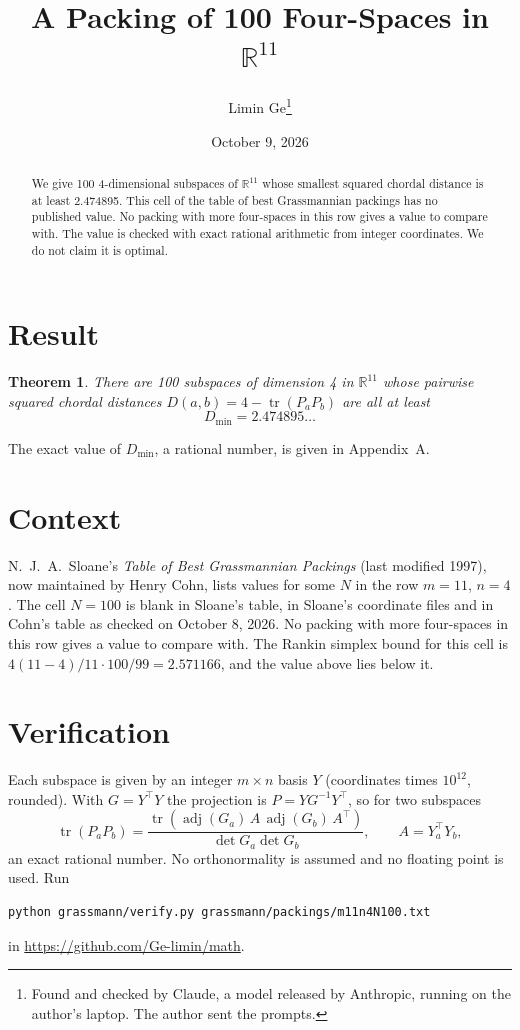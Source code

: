 \documentclass[11pt,a4paper]{article}
\title{A Packing of 100 Four-Spaces in $\mathbb{R}^{11}$}
\author{Limin Ge\thanks{Found and checked by Claude, a model released by Anthropic, running on the author's laptop. The author sent the prompts.}}
\date{October 9, 2026}
\newtheorem*{theorem}{Theorem}
\begin{document}
\maketitle
\begin{abstract}
We give 100 4-dimensional subspaces of $\mathbb{R}^{11}$ whose smallest squared chordal distance is at least 2.474895. This cell of the table of best Grassmannian packings has no published value. No packing with more four-spaces in this row gives a value to compare with. The value is checked with exact rational arithmetic from integer coordinates. We do not claim it is optimal.
\end{abstract}

\section{Result}
\begin{theorem}
There are 100 subspaces of dimension 4 in $\mathbb{R}^{11}$ whose pairwise squared chordal distances $D(a,b) = 4 - \operatorname{tr}(P_aP_b)$ are all at least
\[ D_{\min} = 2.474895\ldots \]
\end{theorem}
The exact value of $D_{\min}$, a rational number, is given in Appendix~A.


\section{Context}
N.~J.~A.~Sloane's \emph{Table of Best Grassmannian Packings} (last modified 1997), now maintained by Henry Cohn, lists values for some $N$ in the row $m=11$, $n=4$. The cell $N=100$ is blank in Sloane's table, in Sloane's coordinate files and in Cohn's table as checked on October 8, 2026. No packing with more four-spaces in this row gives a value to compare with. The Rankin simplex bound for this cell is $4(11-4)/11\cdot 100/99 = 2.571166$, and the value above lies below it.


\section{Verification}
Each subspace is given by an integer $m\times n$ basis $Y$ (coordinates times $10^{12}$, rounded). With $G=Y^\top Y$ the projection is $P=YG^{-1}Y^\top$, so for two subspaces
\[ \operatorname{tr}(P_aP_b)=\frac{\operatorname{tr}(\operatorname{adj}(G_a)\,A\,\operatorname{adj}(G_b)\,A^\top)}{\det G_a\det G_b},\qquad A=Y_a^\top Y_b, \]
an exact rational number. No orthonormality is assumed and no floating point is used. Run
\begin{verbatim}
python grassmann/verify.py grassmann/packings/m11n4N100.txt
\end{verbatim}
in \url{https://github.com/Ge-limin/math}.
\end{document}
